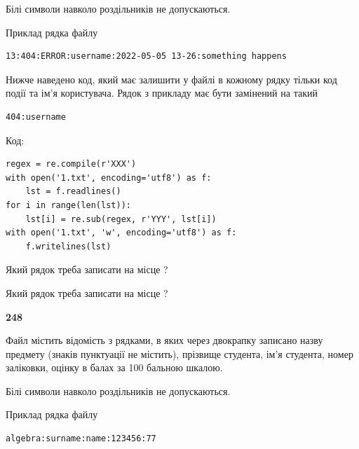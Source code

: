 Білі символи навколо роздільників не допускаються.

Приклад рядка файлу



\begin{verbatim}
13:404:ERROR:username:2022-05-05 13-26:something happens
\end{verbatim}


Нижче наведено код, який має залишити у файлі в кожному рядку тільки код події та ім'я користувача. Рядок з прикладу має бути замінений на такий



\begin{verbatim}
404:username
\end{verbatim}




Код:



\begin{verbatim}
regex = re.compile(r'XXX')
with open('1.txt', encoding='utf8') as f:
    lst = f.readlines()
for i in range(len(lst)):
    lst[i] = re.sub(regex, r'YYY', lst[i])
with open('1.txt', 'w', encoding='utf8') as f:
    f.writelines(lst)
\end{verbatim}







Який рядок треба записати на місце  ?\par
\vspace{5mm}


Який рядок треба записати на місце  ?\par


\newpage

{\begin {center}\textbf{ 248}\end {center}}\par
Файл  містить відомість з рядками, в яких через двокрапку записа\-но назву предмету (знаків пунктуації не містить), прізвище студента, ім'я студента, номер залі\-ков\-ки, оцінку в балах за 100 бальною шкалою.

Білі символи навколо роздільників не допускаються.

Приклад рядка файлу



\begin{verbatim}
algebra:surname:name:123456:77
\end{verbatim}



